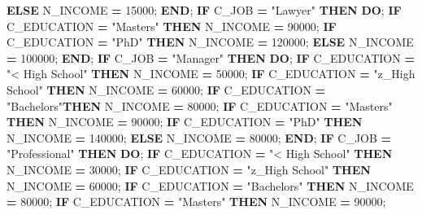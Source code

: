 \documentclass[]{article}
\newenvironment{Shaded}{\begin{snugshade}}{\end{snugshade}}
\newcommand{\KeywordTok}[1]{\textcolor[rgb]{0.13,0.29,0.53}{\textbf{{#1}}}}
\newcommand{\DecValTok}[1]{\textcolor[rgb]{0.00,0.00,0.81}{{#1}}}
\newcommand{\StringTok}[1]{\textcolor[rgb]{0.31,0.60,0.02}{{#1}}}
\newcommand{\NormalTok}[1]{{#1}}
\begin{document}
\begin{Shaded}
\begin{Highlighting}[]
            \KeywordTok{ELSE} \NormalTok{N_INCOME }\KeywordTok{=} \DecValTok{15000}\NormalTok{;}
        \KeywordTok{END}\NormalTok{;}
        \KeywordTok{IF} \NormalTok{C_JOB }\KeywordTok{=} \StringTok{"Lawyer"} \KeywordTok{THEN} \KeywordTok{DO}\NormalTok{;}
            \KeywordTok{IF} \NormalTok{C_EDUCATION }\KeywordTok{=} \StringTok{"Masters"} \KeywordTok{THEN} \NormalTok{N_INCOME }\KeywordTok{=} \DecValTok{90000}\NormalTok{;}
            \KeywordTok{IF} \NormalTok{C_EDUCATION }\KeywordTok{=} \StringTok{"PhD"} \KeywordTok{THEN} \NormalTok{N_INCOME }\KeywordTok{=} \DecValTok{120000}\NormalTok{;}
            \KeywordTok{ELSE} \NormalTok{N_INCOME }\KeywordTok{=} \DecValTok{100000}\NormalTok{;}
        \KeywordTok{END}\NormalTok{;}
        \KeywordTok{IF} \NormalTok{C_JOB }\KeywordTok{=} \StringTok{"Manager"} \KeywordTok{THEN} \KeywordTok{DO}\NormalTok{;}
            \KeywordTok{IF} \NormalTok{C_EDUCATION }\KeywordTok{=} \StringTok{"< High School"} \KeywordTok{THEN} \NormalTok{N_INCOME }\KeywordTok{=} \DecValTok{50000}\NormalTok{;}
            \KeywordTok{IF} \NormalTok{C_EDUCATION }\KeywordTok{=} \StringTok{"z_High School"} \KeywordTok{THEN} \NormalTok{N_INCOME }\KeywordTok{=} \DecValTok{60000}\NormalTok{;}
            \KeywordTok{IF} \NormalTok{C_EDUCATION }\KeywordTok{=} \StringTok{"Bachelors"}\KeywordTok{THEN} \NormalTok{N_INCOME }\KeywordTok{=} \DecValTok{80000}\NormalTok{;}
            \KeywordTok{IF} \NormalTok{C_EDUCATION }\KeywordTok{=} \StringTok{"Masters"} \KeywordTok{THEN} \NormalTok{N_INCOME }\KeywordTok{=} \DecValTok{90000}\NormalTok{;}
            \KeywordTok{IF} \NormalTok{C_EDUCATION }\KeywordTok{=} \StringTok{"PhD"} \KeywordTok{THEN} \NormalTok{N_INCOME }\KeywordTok{=} \DecValTok{140000}\NormalTok{;}
            \KeywordTok{ELSE} \NormalTok{N_INCOME }\KeywordTok{=} \DecValTok{80000}\NormalTok{;}
        \KeywordTok{END}\NormalTok{;}
        \KeywordTok{IF} \NormalTok{C_JOB }\KeywordTok{=} \StringTok{"Professional"} \KeywordTok{THEN} \KeywordTok{DO}\NormalTok{;}
            \KeywordTok{IF} \NormalTok{C_EDUCATION }\KeywordTok{=} \StringTok{"< High School"} \KeywordTok{THEN} \NormalTok{N_INCOME }\KeywordTok{=} \DecValTok{30000}\NormalTok{;}
            \KeywordTok{IF} \NormalTok{C_EDUCATION }\KeywordTok{=} \StringTok{"z_High School"} \KeywordTok{THEN} \NormalTok{N_INCOME }\KeywordTok{=} \DecValTok{60000}\NormalTok{;}
            \KeywordTok{IF} \NormalTok{C_EDUCATION }\KeywordTok{=} \StringTok{"Bachelors"} \KeywordTok{THEN} \NormalTok{N_INCOME }\KeywordTok{=} \DecValTok{80000}\NormalTok{;}
            \KeywordTok{IF} \NormalTok{C_EDUCATION }\KeywordTok{=} \StringTok{"Masters"} \KeywordTok{THEN} \NormalTok{N_INCOME }\KeywordTok{=} \DecValTok{90000}\NormalTok{;}

\end{Highlighting}
\end{Shaded}
\end{document}
